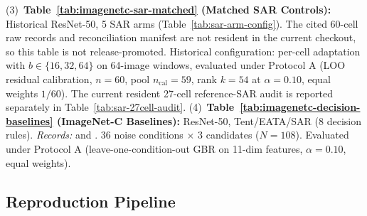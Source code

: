 {(3)~\textbf{Table~\ref{tab:imagenetc-sar-matched} (Matched SAR Controls):} Historical ResNet-50, 5 SAR arms (Table~\ref{tab:sar-arm-config}). The cited 60-cell raw records and reconciliation manifest are not resident in the current checkout, so this table is not release-promoted. Historical configuration: per-cell adaptation with $b \in \{16, 32, 64\}$ on 64-image windows, evaluated under Protocol A (LOO residual calibration, $n=60$, pool $n_{\mathrm{cal}} = 59$, rank $k = 54$ at $\alpha=0.10$, equal weights $1/60$). The current resident 27-cell reference-SAR audit is reported separately in Table~\ref{tab:sar-27cell-audit}.
(4)~\textbf{Table~\ref{tab:imagenetc-decision-baselines} (ImageNet-C Baselines):} ResNet-50, Tent/EATA/SAR (8 decision rules). \emph{Records:}  and . 36 noise conditions $\times$ 3 candidates ($N=108$). Evaluated under Protocol A (leave-one-condition-out GBR on 11-dim features, $\alpha=0.10$, equal weights).}
\begin{table}[t]
\centering
\small
\caption{Unified Master Statistical Synthesis Matrix across evaluated empirical tracks. For each track, we summarize the evaluation unit, sample size $n$, baseline contrasts with nominal confidence intervals, multiplicity-adjusted significance, and empirical verdict.}
\label{tab:master-statistical-synthesis}
\resizebox{0.90\textwidth}{!}{}
\end{table}

\subsection{Reproduction Pipeline}

